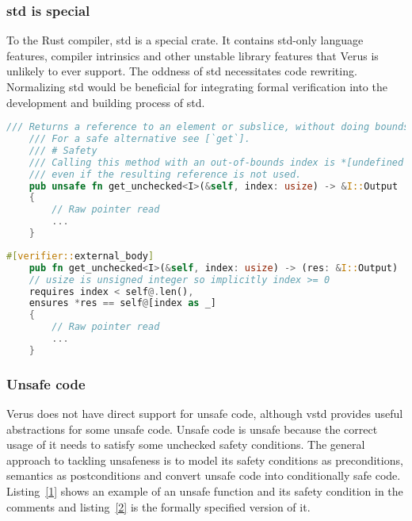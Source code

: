 \documentclass[conference]{IEEEtran}
\begin{document}
\subsubsection{std is special}
To the Rust compiler, std is a special crate. It contains std-only language features, compiler intrinsics and other unstable library features that Verus is unlikely to ever support. The oddness of std necessitates code rewriting. Normalizing std would be beneficial for integrating formal verification into the development and building process of std.     

\begin{lstlisting}[language=Rust,style=colouredRust, caption={a simplified example of the safety condition of an unsafe public function in std}, label = {1}]
     /// Returns a reference to an element or subslice, without doing bounds checking.
    /// For a safe alternative see [`get`].
    /// # Safety
    /// Calling this method with an out-of-bounds index is *[undefined behavior]*
    /// even if the resulting reference is not used.
    pub unsafe fn get_unchecked<I>(&self, index: usize) -> &I::Output
    {
        // Raw pointer read  
        ...
    }
\end{lstlisting}

\begin{lstlisting}[language=Rust,style=colouredRust, caption={a simplified example of converting an unsafe function into a conditionally safe function. We do not need the \texttt{unsafe} keyword in the function signature if the caller is also verified. The \texttt{external\_body} annotation makes the verifier ignore the function body. The safety condition in the comment is also replaced with a precondition. The \texttt{@} operator is a syntactic sugar that returns the abstract representation of the operand.}, label = {2}]
    #[verifier::external_body]
    pub fn get_unchecked<I>(&self, index: usize) -> (res: &I::Output)
    // usize is unsigned integer so implicitly index >= 0
    requires index < self@.len(),
    ensures *res == self@[index as _]
    {
        // Raw pointer read  
        ...
    }
\end{lstlisting}
\subsubsection{Unsafe code}
Verus does not have direct support for unsafe code, although vstd provides useful abstractions for some unsafe code. Unsafe code is unsafe because the correct usage of it needs to satisfy some unchecked safety conditions. The general approach to tackling unsafeness is to model its safety conditions as preconditions, semantics as postconditions and convert unsafe code into conditionally safe code. Listing~\ref{1} shows an example of an unsafe function and its safety condition in the comments and listing~\ref{2} is the formally specified version of it.      
\end{document}

